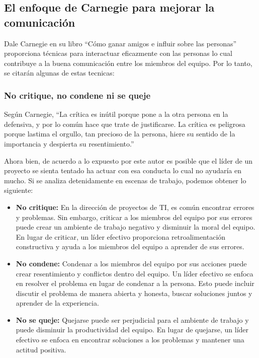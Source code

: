 \documentclass[journal]{IEEEtran}
\begin{document}
\subsection{El enfoque de Carnegie para mejorar la comunicación}
Dale Carnegie en su libro “Cómo ganar amigos e influir sobre las personas” proporciona técnicas para interactuar eficazmente con las personas lo cual contribuye a la buena comunicación entre los miembros del equipo. Por lo tanto, se citarán algunas de estas tecnicas:

\subsubsection{No critique, no condene ni se queje}
Según Carnegie, “La crítica es inútil porque pone a la otra persona en la defensiva, y por lo común hace que trate de justificarse. La crítica es peligrosa porque lastima el orgullo, tan precioso de la persona, hiere su sentido de la importancia y despierta su resentimiento.”

Ahora bien, de acuerdo a lo expuesto por este autor es posible que el líder de un proyecto se sienta tentado ha actuar con esa conducta lo cual no ayudaría en mucho. Si se analiza detenidamente en escenas de trabajo, podemos obtener lo siguiente:

\begin{itemize}
	\item \textbf{No critique:} En la dirección de proyectos de TI, es común encontrar errores y problemas. Sin embargo, criticar a los miembros del equipo por sus errores puede crear un ambiente de trabajo negativo y disminuir la moral del equipo. En lugar de criticar, un líder efectivo proporciona retroalimentación constructiva y ayuda a los miembros del equipo a aprender de sus errores.
	\item \textbf{No condene:} Condenar a los miembros del equipo por sus acciones puede crear resentimiento y conflictos dentro del equipo. Un líder efectivo se enfoca en resolver el problema en lugar de condenar a la persona. Esto puede incluir discutir el problema de manera abierta y honesta, buscar soluciones juntos y aprender de la experiencia.
	\item \textbf{No se queje: }Quejarse puede ser perjudicial para el ambiente de trabajo y puede disminuir la productividad del equipo. En lugar de quejarse, un líder efectivo se enfoca en encontrar soluciones a los problemas y mantener una actitud positiva.
\end{itemize}
\end{document}
